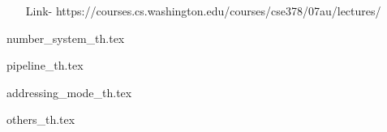 
\begin{enumerate}
    \item[Link-] https://courses.cs.washington.edu/courses/cse378/07au/lectures/
\end{enumerate}

{number_system_th.tex}      \newpage

{pipeline_th.tex}            \newpage

{addressing_mode_th.tex}            \newpage

{others_th.tex}            \newpage
